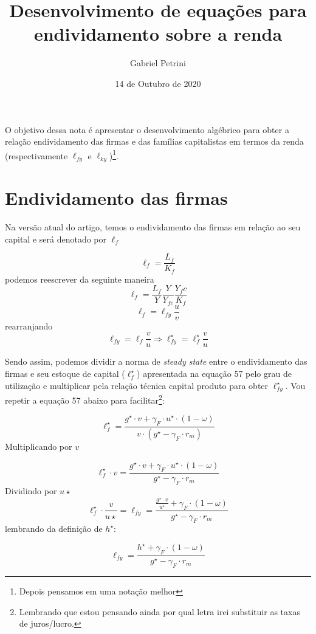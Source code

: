 \documentclass[11pt]{article}
\author{Gabriel Petrini}
\date{14 de Outubro de 2020}
\title{Desenvolvimento de equações para endividamento sobre a renda}
\begin{document}
\maketitle
O objetivo dessa nota é apresentar o desenvolvimento algébrico para obter a relação endividamento das firmas e das famílias capitalistas em termos da renda (respectivamente \(\ell_{fy}\) e \(\ell_{ky}\))\footnote{Depois pensamos em uma notação melhor}. 

\section*{Endividamento das firmas}
\label{sec:orgb5d8f80}

Na versão atual do artigo, temos o endividamento das firmas em relação ao seu capital e será denotado por \(\ell_f\)

$$
\ell_f = \frac{L_f}{K_f}
$$
podemos reescrever da seguinte maneira
$$
\ell_f = \frac{L_f}{Y}\frac{Y}{Y_{fc}}\frac{Y_fc}{K_f}
$$
$$
\ell_f = \ell_{fy}\frac{u}{v}
$$
rearranjando
$$
\ell_{fy} = \ell_f\frac{v}{u} \Rightarrow \ell_{fy}^\star = \ell_f^\star\frac{v}{u}
$$

Sendo assim, podemos dividir a norma de \emph{steady state} entre o endividamento das firmas e seu estoque de capital (\(\ell_f^\star\)) apresentada na equação 57 pelo grau de utilização e multiplicar pela relação técnica capital produto para obter \(\ell_{fy}^\star\). Vou repetir a equação 57 abaixo para facilitar\footnote{Lembrando que estou pensando ainda por qual letra irei substituir as taxas de juros/lucro.}:

\begin{equation}
\tag{57}
\ell_f^\star = \frac{g^\star\cdot v + \gamma_F\cdot u^\star\cdot (1-\omega)}{v\cdot (g^\star - \gamma_F \cdot r_m)}
\end{equation}
Multiplicando por \(v\)

\begin{equation}
\ell_f^\star\cdot v = \frac{g^\star\cdot v + \gamma_F\cdot u^\star\cdot (1-\omega)}{g^\star - \gamma_F \cdot r_m}
\end{equation}
Dividindo por \(u\star\)
\begin{equation}
\ell_f^\star\cdot \frac{v}{u\star} = \ell_{fy} = \frac{\frac{g^\star\cdot v}{u^\star} + \gamma_F\cdot (1-\omega)}{g^\star - \gamma_F\cdot r_m}
\end{equation}
lembrando da definição de \(h^\star\):

\begin{equation}
\label{endiv_firm}
\ell_{fy} = \frac{h^\star + \gamma_F\cdot (1-\omega)}{g^\star - \gamma_F\cdot r_m}
\end{equation}
\end{document}
